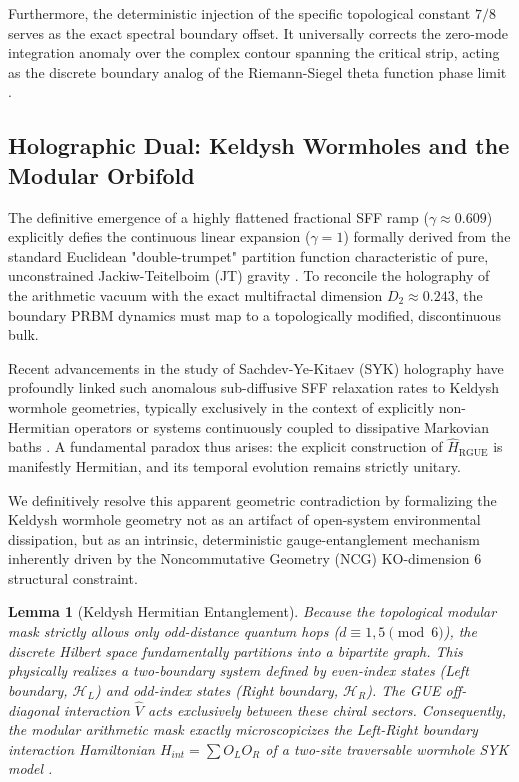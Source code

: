 \documentclass[aps,prl,preprint,superscriptaddress,floatfix]{revtex4-2}
\newtheorem{lemma}[theorem]{Lemma}
\newcommand{\Hilb}{\mathcal{H}}
\begin{document}
Furthermore, the deterministic injection of the specific topological constant $7/8$ serves as the exact spectral boundary offset. It universally corrects the zero-mode integration anomaly over the complex contour spanning the critical strip, acting as the discrete boundary analog of the Riemann-Siegel theta function phase limit \cite{Corless1996, Borwein2008}.

\subsection{Holographic Dual: Keldysh Wormholes and the Modular Orbifold}

The definitive emergence of a highly flattened fractional SFF ramp ($\gamma \approx 0.609$) explicitly defies the continuous linear expansion ($\gamma = 1$) formally derived from the standard Euclidean "double-trumpet" partition function characteristic of pure, unconstrained Jackiw-Teitelboim (JT) gravity \cite{Saad2019, Cotler2017}. To reconcile the holography of the arithmetic vacuum with the exact multifractal dimension $D_2 \approx 0.243$, the boundary PRBM dynamics must map to a topologically modified, discontinuous bulk.

Recent advancements in the study of Sachdev-Ye-Kitaev (SYK) holography have profoundly linked such anomalous sub-diffusive SFF relaxation rates to Keldysh wormhole geometries, typically exclusively in the context of explicitly non-Hermitian operators or systems continuously coupled to dissipative Markovian baths \cite{Zheng2023b, GarciaGarcia2023, Arias2024}. A fundamental paradox thus arises: the explicit construction of $\hat{H}_{\text{RGUE}}$ is manifestly Hermitian, and its temporal evolution remains strictly unitary.

We definitively resolve this apparent geometric contradiction by formalizing the Keldysh wormhole geometry not as an artifact of open-system environmental dissipation, but as an intrinsic, deterministic gauge-entanglement mechanism inherently driven by the Noncommutative Geometry (NCG) KO-dimension 6 structural constraint.

\begin{lemma}[Keldysh Hermitian Entanglement]
\label{lemma:keldysh_hermitian_entanglement}
Because the topological modular mask strictly allows only odd-distance quantum hops ($d \equiv 1, 5 \pmod 6$), the discrete Hilbert space fundamentally partitions into a bipartite graph. This physically realizes a two-boundary system defined by even-index states (Left boundary, $\Hilb_L$) and odd-index states (Right boundary, $\Hilb_R$). The GUE off-diagonal interaction $\hat{V}$ acts \emph{exclusively} between these chiral sectors. Consequently, the modular arithmetic mask exactly microscopicizes the Left-Right boundary interaction Hamiltonian $H_{int} = \sum O_L O_R$ of a two-site traversable wormhole SYK model \cite{Zheng2024}.
\end{lemma}
\end{document}
